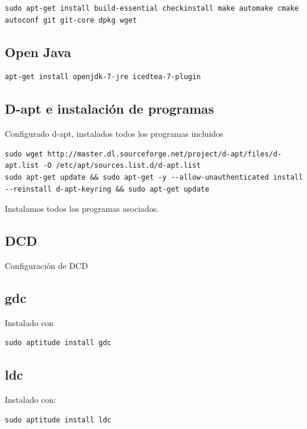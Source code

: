 \documentclass[12pt,spanish,]{article}
\begin{document}
\begin{verbatim}
sudo apt-get install build-essential checkinstall make automake cmake autoconf git git-core dpkg wget
\end{verbatim}

\subsection{Open Java}\label{open-java}

\begin{verbatim}
apt-get install openjdk-7-jre icedtea-7-plugin
\end{verbatim}

\subsection{D-apt e instalación de
programas}\label{d-apt-e-instalaciuxf3n-de-programas}

Configurado d-apt, instalados todos los programas incluidos

\begin{verbatim}
sudo wget http://master.dl.sourceforge.net/project/d-apt/files/d-apt.list -O /etc/apt/sources.list.d/d-apt.list
sudo apt-get update && sudo apt-get -y --allow-unauthenticated install --reinstall d-apt-keyring && sudo apt-get update
\end{verbatim}

Instalamos todos los programas asociados.

\subsection{DCD}\label{dcd}

Configuración de DCD

\subsection{gdc}\label{gdc}

Instalado con

\begin{verbatim}
sudo aptitude install gdc
\end{verbatim}

\subsection{ldc}\label{ldc}

Instalado con:

\begin{verbatim}
sudo aptitude install ldc
\end{verbatim}
\end{document}
